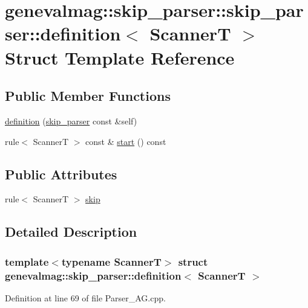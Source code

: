 \hypertarget{structgenevalmag_1_1skip__parser_1_1definition}{
\section{genevalmag::skip\_\-parser::skip\_\-parser::definition$<$ ScannerT $>$ Struct Template Reference}
\label{structgenevalmag_1_1skip__parser_1_1definition}
}
\subsection*{Public Member Functions}
\begin{CompactItemize}
\item 
\hyperlink{structgenevalmag_1_1skip__parser_1_1definition_81f452faedc18942f3448db0209e34b7}{definition} (\hyperlink{structgenevalmag_1_1skip__parser}{skip\_\-parser} const \&self)
\item 
rule$<$ ScannerT $>$ const \& \hyperlink{structgenevalmag_1_1skip__parser_1_1definition_748139db24deb542da0afc2a5ff14a79}{start} () const 
\end{CompactItemize}
\subsection*{Public Attributes}
\begin{CompactItemize}
\item 
rule$<$ ScannerT $>$ \hyperlink{structgenevalmag_1_1skip__parser_1_1definition_d8644fb67b5f8a7a6fc6c0a3feb34c03}{skip}
\end{CompactItemize}


\subsection{Detailed Description}
\subsubsection*{template$<$typename ScannerT$>$ struct genevalmag::skip\_\-parser::definition$<$ ScannerT $>$}



Definition at line 69 of file Parser\_\-AG.cpp.

